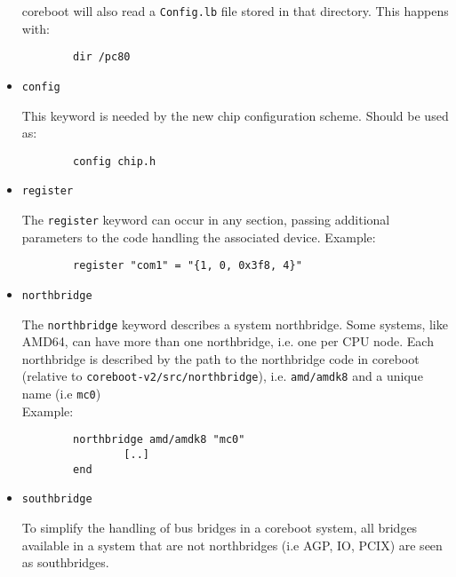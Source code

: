 \documentclass[titlepage,12pt]{article}
\begin{document}
\begin{itemize}
coreboot will also read a \texttt{Config.lb} file stored in that
directory. This happens with:

\begin{verbatim}
        dir /pc80
\end{verbatim}


\item \begin{verbatim}config\end{verbatim}

This keyword is needed by the new chip configuration scheme. Should be
used as:

\begin{verbatim}
        config chip.h
\end{verbatim}

\item \begin{verbatim}register\end{verbatim}
The \texttt{register} keyword can occur in any section, passing
additional \\
parameters to the code handling the associated device.
Example:

\begin{verbatim}
        register "com1" = "{1, 0, 0x3f8, 4}"
\end{verbatim}

\item \begin{verbatim}northbridge\end{verbatim}

The \texttt{northbridge} keyword describes a system northbridge. Some
systems, like AMD64, can have more than one northbridge, i.e. one per
CPU node. Each northbridge is described by the path to the northbridge
code in coreboot (relative to \texttt{coreboot-v2/src/northbridge}), i.e.
\texttt{amd/amdk8} and a unique name (i.e \texttt{mc0}) \\
Example:

\begin{verbatim}
        northbridge amd/amdk8 "mc0"
                [..]
        end
\end{verbatim}

\item \begin{verbatim}southbridge\end{verbatim}

To simplify the handling of bus bridges in a coreboot system, all
bridges available in a system that are not northbridges (i.e AGP, IO,
PCIX) are seen as southbridges.


\end{itemize}
\end{document}

